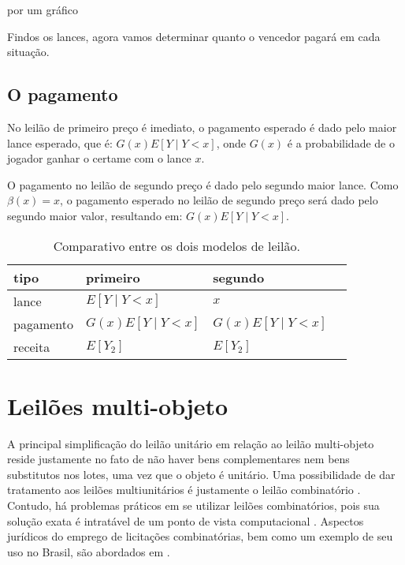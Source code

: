 { \huge por um gráfico }

Findos os lances, agora vamos determinar quanto o vencedor pagará em cada situação.

\subsection{O pagamento}

No leilão de primeiro preço é imediato, o pagamento esperado é dado pelo maior lance esperado, que é: $G(x)E\left[ Y \mid Y<x \right]$, onde $G(x)$ é a probabilidade de o jogador ganhar o certame com o lance $x$.

O pagamento no leilão de segundo preço é dado pelo segundo maior lance. Como $\beta(x) = x$, o pagamento esperado no leilão de segundo preço será dado pelo segundo maior valor, resultando em: $G(x)E\left[ Y \mid Y<x \right]$.

\begin{table}[]
	\centering
	\begin{tabular}{@{}llll@{}}
		\toprule
		tipo      & primeiro 					     & segundo      					\\ \midrule
		lance     & $E\left[ Y \mid Y<x \right]$     & $x$             					\\
		pagamento & $G(x)E\left[ Y \mid Y<x \right]$ & $G(x)E\left[ Y \mid Y<x \right]$ \\
		receita   & $E\left[ Y_2 \right]$            & $E\left[ Y_2 \right]$            \\
	\end{tabular}
	\caption{Comparativo entre os dois modelos de leilão.}
	\label{tab:tabela1}
\end{table}

\section{Leilões multi-objeto}

A principal simplificação do leilão unitário em relação ao leilão multi-objeto reside justamente no fato de não haver bens complementares nem bens substitutos nos lotes, uma vez que o objeto é unitário. Uma possibilidade de dar tratamento aos leilões multiunitários é justamente o leilão combinatório \citet{Shoham2008}. Contudo, há problemas práticos em se utilizar leilões combinatórios, pois sua solução exata é intratável de um ponto de vista computacional \citet{Nisan2007}. Aspectos jurídicos do emprego de licitações combinatórias, bem como um exemplo de seu uso no Brasil, são abordados em \citet{pellegrini2018:MSc}.

